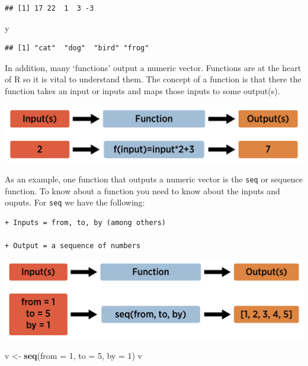 \documentclass[
]{book}
\newenvironment{Shaded}{\begin{snugshade}}{\end{snugshade}}
\newcommand{\DataTypeTok}[1]{\textcolor[rgb]{0.13,0.29,0.53}{#1}}
\newcommand{\DecValTok}[1]{\textcolor[rgb]{0.00,0.00,0.81}{#1}}
\newcommand{\KeywordTok}[1]{\textcolor[rgb]{0.13,0.29,0.53}{\textbf{#1}}}
\newcommand{\NormalTok}[1]{#1}
\newcommand{\StringTok}[1]{\textcolor[rgb]{0.31,0.60,0.02}{#1}}
\theoremstyle{definition}
\theoremstyle{definition}
\theoremstyle{definition}
\theoremstyle{remark}
\begin{document}
\begin{verbatim}
## [1] 17 22  1  3 -3
\end{verbatim}

\begin{Shaded}
\begin{Highlighting}[]
\NormalTok{y}
\end{Highlighting}
\end{Shaded}

\begin{verbatim}
## [1] "cat"  "dog"  "bird" "frog"
\end{verbatim}

In addition, many `functions' output a numeric vector. Functions are at the heart of R so it is vital to understand them. The concept of a function is that there the function takes an input or inputs and maps those inputs to some output(s).

\begin{center}\includegraphics[width=0.8\linewidth]{img/funVisual1F} \end{center}

As an example, one function that outputs a numeric vector is the \texttt{seq} or sequence function. To know about a function you need to know about the inputs and ouputs. For \texttt{seq} we have the following:

\begin{verbatim}
+ Inputs = from, to, by (among others)  

+ Output = a sequence of numbers
\end{verbatim}

\begin{center}\includegraphics[width=0.8\linewidth]{img/funVisual2F} \end{center}

\begin{Shaded}
\begin{Highlighting}[]
\NormalTok{v <-}\StringTok{ }\KeywordTok{seq}\NormalTok{(}\DataTypeTok{from =} \DecValTok{1}\NormalTok{, }\DataTypeTok{to =} \DecValTok{5}\NormalTok{, }\DataTypeTok{by =} \DecValTok{1}\NormalTok{)}
\NormalTok{v}
\end{Highlighting}
\end{Shaded}
\end{document}
